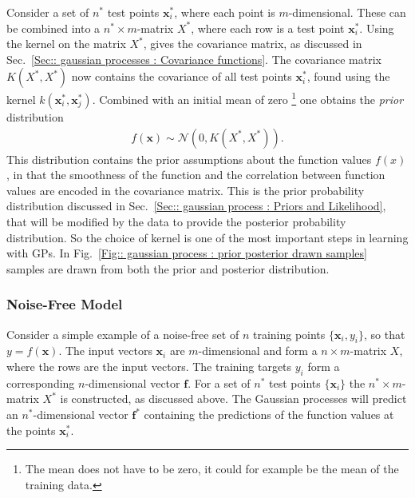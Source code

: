 \documentclass[twoside,english]{uiofysmaster}
\begin{document}
Consider a set of $n^*$ test points  $\textbf{x}^*_i$, where each point is $m$-dimensional. These can be combined into a $n^* \times m$-matrix $X^*$, where each row is a test point $\textbf{x}^*_i$. Using the kernel on the matrix $X^*$, gives the covariance matrix, as discussed in Sec.~\ref{Sec:: gaussian processes : Covariance functions}. The covariance matrix $K(X^*, X^*)$ now contains the covariance of all test points $\textbf{x}^*_i$, found using the kernel $k(\textbf{x}_i^*, \textbf{x}_j^*)$. Combined with an initial mean of zero \footnote{The mean does not have to be zero, it could for example be the mean of the training data.} one obtains the \textit{prior} distribution
\begin{align}
f(\textbf{x}) \sim \mathcal{N} (0, K(X^*, X^*)).
\end{align} 
This distribution contains the prior assumptions about the function values $f(x)$, in that the smoothness of the function and the correlation between function values are encoded in the covariance matrix. This is the prior probability distribution discussed in Sec.~\ref{Sec:: gaussian process : Priors and Likelihood}, that will be modified by the data to provide the posterior probability distribution. So the choice of kernel is one of the most important steps in learning with GPs. In Fig.~\ref{Fig:: gaussian process : prior posterior drawn samples} samples are drawn from both the prior and posterior distribution.



\subsubsection{Noise-Free Model}

Consider a simple example of a noise-free set of $n$ training points $\{\textbf{x}_i, y_i\}$, so that $y = f(\textbf{x})$. The input vectors $\textbf{x}_i$ are $m$-dimensional and form a $n \times m$-matrix $X$, where the rows are the input vectors. The training targets $y_i$ form a corresponding $n$-dimensional vector $\textbf{f}$. For a set of $n^*$ test points $\{\textbf{x}_i \}$ the $n^* \times m$-matrix $X^*$ is constructed, as discussed above. The Gaussian processes will predict an $n^*$-dimensional vector $\textbf{f}^*$ containing the predictions of the function values at the points $\textbf{x}^*_i$. 
\end{document}
